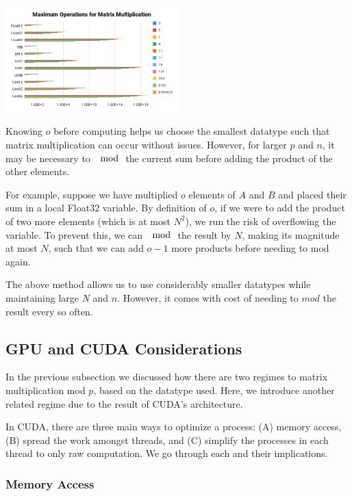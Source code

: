 \begin{center}
\includegraphics*[width=0.5\textwidth]{MatMulMaxOps.png}
\end{center}

Knowing $o$ before computing helps us choose the smallest datatype such that matrix multiplication can occur without issues. However, for larger $p$ and $n$, it may be necessary to $\mod$ the current sum before adding the product of the other elements. 

For example, suppose we have multiplied $o$ elements of $A$ and $B$ and placed their sum in a local Float32 variable. By definition of $o$, if we were to add the product of two more elements (which is at most $N^2$), we run the risk of overflowing the variable. To prevent this, we can $\mod$ the result by $N$, making its magnitude at most $N$, such that we can add $o-1$ more products before needing to mod again.

The above method allows us to use considerably smaller datatypes while maintaining large $N$ and $n$. However, it comes with cost of needing to $mod$ the result every so often.

\subsection{GPU and CUDA Considerations}

In the previous subsection we discussed how there are two regimes to matrix multiplication mod $p$, based on the datatype used. Here, we introduce another related regime due to the result of CUDA's architecture.

In CUDA, there are three main ways to optimize a process: (A) memory access, (B) spread the work amongst threads, and (C) simplify the processes in each thread to only raw computation. We go through each and their implications.

\subsubsection{Memory Access}

